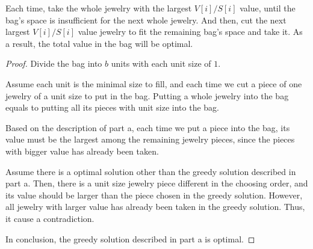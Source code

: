 \begin{homeworkProblem}

\begin{homeworkSubProblem}

Each time, take the whole jewelry with the largest $V[i]/S[i]$ value,
until the bag's space is insufficient for the next whole jewelry.
And then, cut the next largest $V[i]/S[i]$ value jewelry to fit
the remaining bag's space and take it. As a result, the total value
in the bag will be optimal.

\end{homeworkSubProblem}

\begin{homeworkSubProblem}

\begin{proof}
Divide the bag into $b$ units with each unit size of $1$.

Assume each unit is the minimal size to fill,
and each time we cut a piece of one jewelry of a unit size
to put in the bag. Putting a whole jewelry into the bag equals
to putting all its pieces with unit size into the bag.

Based on the description of part a, 
each time we put a piece into the bag, its value
must be the largest among the remaining jewelry pieces,
since the pieces with bigger value has already been taken.

Assume there is a optimal solution other than the greedy solution
described in part a. Then, there is a unit size jewelry piece different
in the choosing order,
and its value should be larger than the piece chosen in the greedy
solution. However, all jewelry with larger value has already been taken
in the greedy solution. Thus, it cause a contradiction.

In conclusion, the greedy solution described in part a is optimal.
\end{proof}

\end{homeworkSubProblem}

\end{homeworkProblem}
